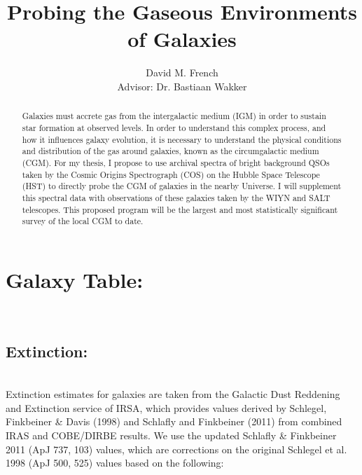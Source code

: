 \documentclass[iop]{emulateapj-rtx4}
\begin{document}

\title{Probing the Gaseous Environments of Galaxies}
\author{David M. French \\
Advisor: Dr. Bastiaan Wakker}



\begin{abstract}


Galaxies must accrete gas from the intergalactic medium (IGM) in order to sustain star formation at observed levels. In order to understand this complex process, and how it influences galaxy evolution, it is necessary to understand the physical conditions and distribution of the gas around galaxies, known as the circumgalactic medium (CGM). For my thesis, I propose to use archival spectra of bright background QSOs taken by the Cosmic Origins Spectrograph (COS) on the Hubble Space Telescope (HST) to directly probe the CGM of galaxies in the nearby Universe. I will supplement this spectral data with observations of these galaxies taken by the WIYN and SALT telescopes. This proposed program will be the largest and most statistically significant survey of the local CGM to date.

\end{abstract}


\section{Galaxy Table:}\\

\subsection{Extinction:}\\

Extinction estimates for galaxies are taken from the Galactic Dust Reddening and Extinction service of IRSA, which provides values derived by Schlegel, Finkbeiner \& Davis (1998) and Schlafly and Finkbeiner (2011) from combined IRAS and COBE/DIRBE results. We use the updated Schlafly \& Finkbeiner 2011 (ApJ 737, 103) values, which are corrections on the original Schlegel et al. 1998 (ApJ 500, 525) values based on the following:
\end{document}

